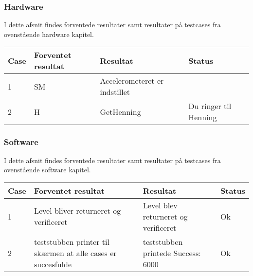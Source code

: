 \subsubsection{Hardware}
I dette afsnit findes forventede resultater samt resultater på testcases fra ovenstående hardware kapitel.\\
\begin{table}[htbp]
\centering
\begin{tabular}{| p{1.5cm}  | p{3cm} | p{4.5cm} | p{4.5cm} |}
\hline
Case &Forventet resultat &Resultat &Status\\\hline
1 &SM &Accelerometeret er indstillet & \\\hline
2 &H &GetHenning &Du ringer til Henning\\\hline
\end{tabular}
\end{table}
\subsubsection{Software}
I dette afsnit findes forventede resultater samt resultater på testcases fra ovenstående software kapitel.\\
\begin{table}[htbp]
\centering
\begin{tabular}{| p{1.5cm}  | p{3cm} | p{4.5cm} | p{4.5cm} |}
\hline
Case &Forventet resultat &Resultat &Status\\\hline
1 &Level bliver returneret og verificeret &Level blev returneret og verificeret &Ok \\\hline
2 &teststubben printer til skærmen at alle cases er succesfulde &teststubben printede Success: 6000 &Ok\\\hline
\end{tabular}
\end{table}